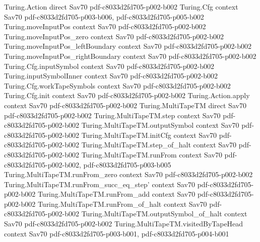 \begin{theorem}
\label{Complexity.LogProg.SavitchARM.outerV_run}
\leanok
\proofstep
  {Turing.Action}
  {direct}
  {Sav70}
  {pdf-c8033d2fd705-p002-b002}
\proofstep
  {Turing.Cfg}
  {context}
  {Sav70}
  {pdf-c8033d2fd705-p003-b006,
    pdf-c8033d2fd705-p005-b002}
\proofstep
  {Turing.moveInputPos}
  {context}
  {Sav70}
  {pdf-c8033d2fd705-p002-b002}
\proofstep
  {Turing.moveInputPos_zero}
  {context}
  {Sav70}
  {pdf-c8033d2fd705-p002-b002}
\proofstep
  {Turing.moveInputPos_leftBoundary}
  {context}
  {Sav70}
  {pdf-c8033d2fd705-p002-b002}
\proofstep
  {Turing.moveInputPos_rightBoundary}
  {context}
  {Sav70}
  {pdf-c8033d2fd705-p002-b002}
\proofstep
  {Turing.Cfg.inputSymbol}
  {context}
  {Sav70}
  {pdf-c8033d2fd705-p002-b002}
\proofstep
  {Turing.inputSymbolInner}
  {context}
  {Sav70}
  {pdf-c8033d2fd705-p002-b002}
\proofstep
  {Turing.Cfg.workTapeSymbols}
  {context}
  {Sav70}
  {pdf-c8033d2fd705-p002-b002}
\proofstep
  {Turing.Cfg.init}
  {context}
  {Sav70}
  {pdf-c8033d2fd705-p002-b002}
\proofstep
  {Turing.Action.apply}
  {context}
  {Sav70}
  {pdf-c8033d2fd705-p002-b002}
\proofstep
  {Turing.MultiTapeTM}
  {direct}
  {Sav70}
  {pdf-c8033d2fd705-p002-b002}
\proofstep
  {Turing.MultiTapeTM.step}
  {context}
  {Sav70}
  {pdf-c8033d2fd705-p002-b002}
\proofstep
  {Turing.MultiTapeTM.outputSymbol}
  {context}
  {Sav70}
  {pdf-c8033d2fd705-p002-b002}
\proofstep
  {Turing.MultiTapeTM.initCfg}
  {context}
  {Sav70}
  {pdf-c8033d2fd705-p002-b002}
\proofstep
  {Turing.MultiTapeTM.step_of_halt}
  {context}
  {Sav70}
  {pdf-c8033d2fd705-p002-b002}
\proofstep
  {Turing.MultiTapeTM.runFrom}
  {context}
  {Sav70}
  {pdf-c8033d2fd705-p002-b002,
    pdf-c8033d2fd705-p003-b005}
\proofstep
  {Turing.MultiTapeTM.runFrom_zero}
  {context}
  {Sav70}
  {pdf-c8033d2fd705-p002-b002}
\proofstep
  {Turing.MultiTapeTM.runFrom_succ_eq_step'}
  {context}
  {Sav70}
  {pdf-c8033d2fd705-p002-b002}
\proofstep
  {Turing.MultiTapeTM.runFrom_add}
  {context}
  {Sav70}
  {pdf-c8033d2fd705-p002-b002}
\proofstep
  {Turing.MultiTapeTM.runFrom_of_halt}
  {context}
  {Sav70}
  {pdf-c8033d2fd705-p002-b002}
\proofstep
  {Turing.MultiTapeTM.outputSymbol_of_halt}
  {context}
  {Sav70}
  {pdf-c8033d2fd705-p002-b002}
\proofstep
  {Turing.MultiTapeTM.visitedByTapeHead}
  {context}
  {Sav70}
  {pdf-c8033d2fd705-p003-b001,
    pdf-c8033d2fd705-p004-b001}

\end{theorem}
